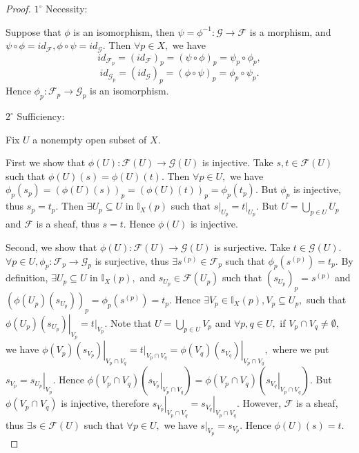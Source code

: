 \begin{proof}
$\mathit{1^{\circ}}$ Necessity:

Suppose that $\phi$ is an isomorphism, then $\psi=\phi^{-1}:
\mathscr{G}\rightarrow \mathscr{F}$ is a morphism, and
$\psi\circ\phi=id_{\mathscr{F}}, \phi\circ\psi=id_{\mathscr{G}}.$
Then $\forall p\in X,$ we have
$$id_{\mathscr{F}_p}=(id_{\mathscr{F}})_p=(\psi\circ\phi)_p=\psi_p\circ\phi_p,$$
$$id_{\mathscr{G}_p}=(id_{\mathscr{G}})_p=(\phi\circ\psi)_p=\phi_p\circ\psi_p.$$
Hence $\phi_p: \mathscr{F}_p\rightarrow \mathscr{G}_p$ is an
isomorphism.

$\mathit{2^{\circ}}$ Sufficiency:

Fix $U$ a nonempty open subset of $X.$

First we show that $\phi(U): \mathscr{F}(U)\rightarrow
\mathscr{G}(U)$ is injective. Take $s,t\in \mathscr{F}(U)$ such that
$\phi(U)(s)=\phi(U)(t).$ Then $\forall p\in U,$ we have
$\phi_p(s_p)=(\phi(U)(s))_p=(\phi(U)(t))_p=\phi_p(t_p).$ But
$\phi_p$ is injective, thus $s_p=t_p.$ Then $\exists U_p\subseteq U$
in $\mathds{I}_X(p)$ such that $\left.s\right|_{U_p} =
\left.t\right|_{U_p}.$ But $U = \bigcup\limits_{p\in U}U_p$ and
$\mathscr{F}$ is a sheaf, thus $s=t.$ Hence $\phi(U)$ is injective.

Second, we show that $\phi(U): \mathscr{F}(U)\rightarrow
\mathscr{G}(U)$ is surjective. Take $t\in \mathscr{G}(U).$ $\forall
p\in U, \phi_p: \mathscr{F}_p\rightarrow \mathscr{G}_p$ is
surjective, thus $\exists s^{(p)}\in \mathscr{F}_p$ such that
$\phi_p(s^{(p)})=t_p.$ By definition, $\exists U_p\subseteq U$ in
$\mathds{I}_X(p),$ and $s_{U_p}\in \mathscr{F}(U_p)$ such that
$(s_{U_p})_p=s^{(p)}$ and
$(\phi(U_p)(s_{U_p}))_p=\phi_p(s^{(p)})=t_p.$ Hence $\exists V_p\in
\mathds{I}_X(p),V_p\subseteq U_p,$ such that
$\left.\phi(U_p)(s_{U_p})\right|_{V_p}=\left.t\right|_{V_p}.$ Note
that $U=\bigcup\limits_{p\in U}V_p$ and $\forall p,q\in U,$ if
$V_p\cap V_q\neq \emptyset,$ we have
$\left.\phi(V_p)(s_{V_p})\right|_{V_p\cap V_q} =
\left.t\right|_{V_p\cap
V_q}=\left.\phi(V_q)(s_{V_q})\right|_{V_p\cap V_q},$ where we put
$s_{V_p} = \left.s_{U_p}\right|_{V_p}.$ Hence $\phi(V_p\cap
V_q)(\left.s_{V_p}\right|_{V_p\cap V_q})=\phi(V_p\cap
V_q)(\left.s_{V_q}\right|_{V_p\cap V_q}).$ But $\phi(V_p\cap V_q)$
is injective, therefore $\left.s_{V_p}\right|_{V_p\cap V_q} =
\left.s_{V_q}\right|_{V_p\cap V_q}.$ However, $\mathscr{F}$ is a
sheaf, thus $\exists s\in \mathscr{F}(U)$ such that $\forall p\in
U,$ we have $\left.s\right|_{V_p}=s_{V_p}.$ Hence $\phi(U)(s)=t.$
\end{proof}
